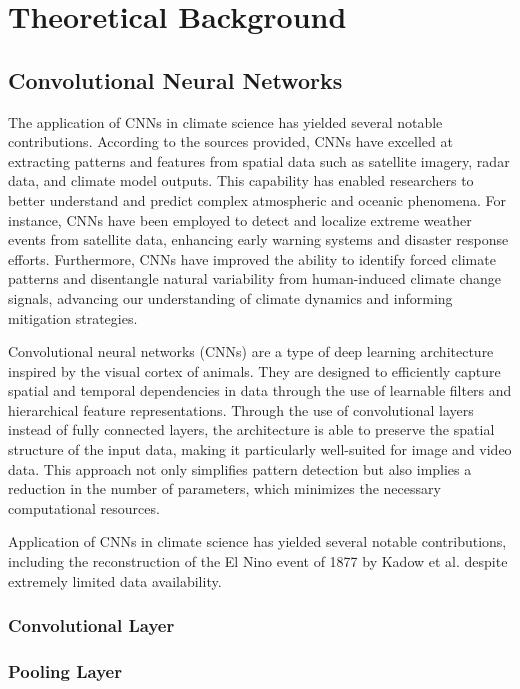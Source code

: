 \section{Theoretical Background}
\label{sec:theory}

\subsection{Convolutional Neural Networks}
\label{subsec:cnn}

The application of CNNs in climate science has yielded several notable contributions. According to the sources provided, CNNs have excelled at extracting patterns and features from spatial data such as satellite imagery, radar data, and climate model outputs. This capability has enabled researchers to better understand and predict complex atmospheric and oceanic phenomena. For instance, CNNs have been employed to detect and localize extreme weather events from satellite data, enhancing early warning systems and disaster response efforts. Furthermore, CNNs have improved the ability to identify forced climate patterns and disentangle natural variability from human-induced climate change signals, advancing our understanding of climate dynamics and informing mitigation strategies.


Convolutional neural networks (CNNs) are a type of deep learning architecture inspired by the visual cortex of animals. They are designed to efficiently capture spatial and temporal dependencies in data through the use of learnable filters and hierarchical feature representations. Through the use of convolutional layers instead of fully connected layers, the architecture is able to preserve the spatial structure of the input data, making it particularly well-suited for image and video data. This approach not only simplifies pattern detection but also implies a reduction in the number of parameters, which minimizes the necessary computational resources.

Application of CNNs in climate science has yielded several notable contributions, including the reconstruction of the El Nino event of 1877 by Kadow et al. despite extremely limited data availability. \cite{kadow2020} 
\subsubsection*{Convolutional Layer}



\subsubsection*{Pooling Layer}

